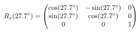 \documentclass[preview]{standalone}
\begin{document}
\begin{align*}
\special{dvisvgm:raw <g id='unique000'>}R_z(27.7^\circ) = \begin{pmatrix} \cos(27.7^\circ) & -\sin(27.7^\circ) & 0 \\ \sin(27.7^\circ) & \cos(27.7^\circ) & 0 \\ 0 & 0 & 1 \end{pmatrix}\special{dvisvgm:raw </g>}
\end{align*}
\end{document}
